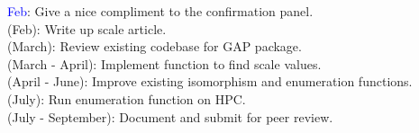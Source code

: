 \documentclass[preview]{standalone}
\begin{document}
\textcolor{blue}{Feb}: Give a nice compliment to the confirmation panel.\\(Feb): Write up scale article.\\(March): Review existing codebase for GAP package.\\(March - April): Implement function to find scale values.\\(April - June): Improve existing isomorphism and enumeration functions.\\(July): Run enumeration function on HPC.\\(July - September): Document and submit for peer review.\\
\end{document}
